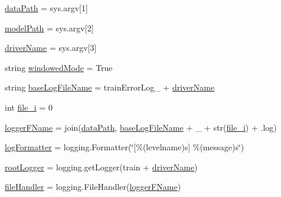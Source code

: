 \begin{DoxyCompactItemize}
\item 
\hyperlink{namespaceSAM_1_1SAM__Core_1_1trainSAMModel_a227131024b77a9c68261ee558002e8c4}{data\+Path} = sys.\+argv\mbox{[}1\mbox{]}
\item 
\hyperlink{namespaceSAM_1_1SAM__Core_1_1trainSAMModel_a23d9f2671eb0af14906ea1e7e7d604b2}{model\+Path} = sys.\+argv\mbox{[}2\mbox{]}
\item 
\hyperlink{namespaceSAM_1_1SAM__Core_1_1trainSAMModel_ae368415e9cd168f04649ec4912f6fbb2}{driver\+Name} = sys.\+argv\mbox{[}3\mbox{]}
\item 
string \hyperlink{namespaceSAM_1_1SAM__Core_1_1trainSAMModel_a3d4d044a08cd44ee4b4b3cde836c5eed}{windowed\+Mode} = \textquotesingle{}True\textquotesingle{}
\item 
string \hyperlink{namespaceSAM_1_1SAM__Core_1_1trainSAMModel_a6de46d6299824b843c610668a3d4e3d0}{base\+Log\+File\+Name} = \textquotesingle{}train\+Error\+Log\+\_\+\textquotesingle{} + \hyperlink{namespaceSAM_1_1SAM__Core_1_1trainSAMModel_ae368415e9cd168f04649ec4912f6fbb2}{driver\+Name}
\item 
int \hyperlink{namespaceSAM_1_1SAM__Core_1_1trainSAMModel_adabd782041187b40f1b3256100a40f18}{file\+\_\+i} = 0
\item 
\hyperlink{namespaceSAM_1_1SAM__Core_1_1trainSAMModel_a9148bf18e6bcdc8a98559470787cbbd3}{logger\+F\+Name} = join(\hyperlink{namespaceSAM_1_1SAM__Core_1_1trainSAMModel_a227131024b77a9c68261ee558002e8c4}{data\+Path}, \hyperlink{namespaceSAM_1_1SAM__Core_1_1trainSAMModel_a6de46d6299824b843c610668a3d4e3d0}{base\+Log\+File\+Name} + \textquotesingle{}\+\_\+\textquotesingle{} + str(\hyperlink{namespaceSAM_1_1SAM__Core_1_1trainSAMModel_adabd782041187b40f1b3256100a40f18}{file\+\_\+i}) + \textquotesingle{}.log\textquotesingle{})
\item 
\hyperlink{namespaceSAM_1_1SAM__Core_1_1trainSAMModel_a49b763d06efdcaac2bc45c6b054827b0}{log\+Formatter} = logging.\+Formatter(\char`\"{}\mbox{[}\%(levelname)s\mbox{]} \%(message)s\char`\"{})
\item 
\hyperlink{namespaceSAM_1_1SAM__Core_1_1trainSAMModel_aa6c9142ef2ae49892e6882a070a3afcd}{root\+Logger} = logging.\+get\+Logger(\textquotesingle{}train \textquotesingle{} + \hyperlink{namespaceSAM_1_1SAM__Core_1_1trainSAMModel_ae368415e9cd168f04649ec4912f6fbb2}{driver\+Name})
\item 
\hyperlink{namespaceSAM_1_1SAM__Core_1_1trainSAMModel_a1b3f8525460c83d22622228cb27fc9ee}{file\+Handler} = logging.\+File\+Handler(\hyperlink{namespaceSAM_1_1SAM__Core_1_1trainSAMModel_a9148bf18e6bcdc8a98559470787cbbd3}{logger\+F\+Name})

\end{DoxyCompactItemize}
